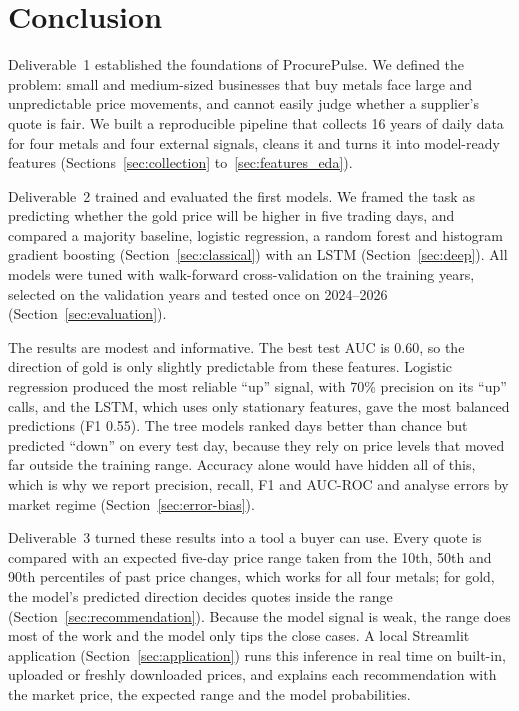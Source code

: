 \section{Conclusion}
\label{sec:conclusion}

Deliverable~1 established the foundations of ProcurePulse. We defined the
problem: small and medium-sized businesses that buy metals face large and
unpredictable price movements, and cannot easily judge whether a supplier's
quote is fair. We built a reproducible pipeline that collects 16 years of daily
data for four metals and four external signals, cleans it and turns it into
model-ready features (Sections~\ref{sec:collection} to~\ref{sec:features_eda}).

Deliverable~2 trained and evaluated the first models. We framed the task as
predicting whether the gold price will be higher in five trading days, and
compared a majority baseline, logistic regression, a random forest and
histogram gradient boosting (Section~\ref{sec:classical}) with an LSTM
(Section~\ref{sec:deep}). All models were tuned with walk-forward
cross-validation on the training years, selected on the validation years and
tested once on 2024--2026 (Section~\ref{sec:evaluation}).

The results are modest and informative. The best test AUC is 0.60, so the
direction of gold is only slightly predictable from these features. Logistic
regression produced the most reliable ``up'' signal, with 70\% precision on
its ``up'' calls, and the LSTM, which uses only stationary features, gave the
most balanced predictions (F1 0.55). The tree models ranked days better than
chance but predicted ``down'' on every test day, because they rely on price
levels that moved far outside the training range. Accuracy alone would have
hidden all of this, which is why we report precision, recall, F1 and AUC-ROC
and analyse errors by market regime (Section~\ref{sec:error-bias}).

Deliverable~3 turned these results into a tool a buyer can use. Every quote is
compared with an expected five-day price range taken from the 10th, 50th and
90th percentiles of past price changes, which works for all four metals; for
gold, the model's predicted direction decides quotes inside the range
(Section~\ref{sec:recommendation}). Because the model signal is weak, the
range does most of the work and the model only tips the close cases. A local
Streamlit application (Section~\ref{sec:application}) runs this inference in
real time on built-in, uploaded or freshly downloaded prices, and explains
each recommendation with the market price, the expected range and the model
probabilities.

